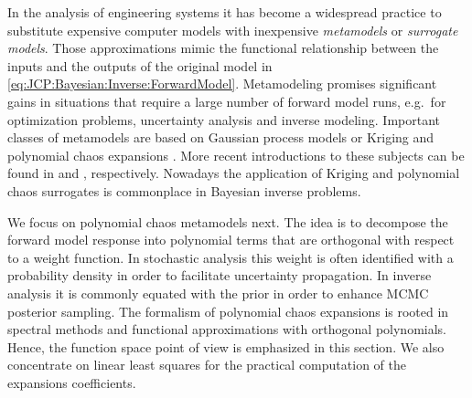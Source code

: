 In the analysis of engineering systems it has become a widespread practice to substitute expensive computer models with inexpensive \emph{metamodels} or \emph{surrogate models}.
Those approximations mimic the functional relationship between the inputs and the outputs of the original model in \cref{eq:JCP:Bayesian:Inverse:ForwardModel}.
Metamodeling promises significant gains in situations that require a large number of forward model runs, e.g.\ for optimization problems, uncertainty analysis and inverse modeling.
Important classes of metamodels are based on Gaussian process models or Kriging \cite{Kriging:OHagan1978,Kriging:Sacks1989} and polynomial chaos expansions \cite{PCE:Ghanem1991}.
More recent introductions to these subjects can be found in \cite{Kriging:Santner2003,Kriging:Rasmussen2006} and \cite{PCE:LeMaitre2010,PCE:Xiu2010}, respectively.
Nowadays the application of Kriging \cite{Kriging:Higdon2004,Kriging:Higdon2015} and polynomial chaos surrogates \cite{PCE:Marzouk2007,PCE:Marzouk2009:a,PCE:Marzouk2009:b}
is commonplace in Bayesian inverse problems.
\par %
We focus on polynomial chaos metamodels next.
The idea is to decompose the forward model response into polynomial terms that are orthogonal with respect to a weight function.
In stochastic analysis this weight is often identified with a probability density in order to facilitate uncertainty propagation.
In inverse analysis it is commonly equated with the prior in order to enhance MCMC posterior sampling.
The formalism of polynomial chaos expansions is rooted in spectral methods and functional approximations with orthogonal polynomials.
Hence, the function space point of view is emphasized in this section.
We also concentrate on linear least squares for the practical computation of the expansions coefficients.


